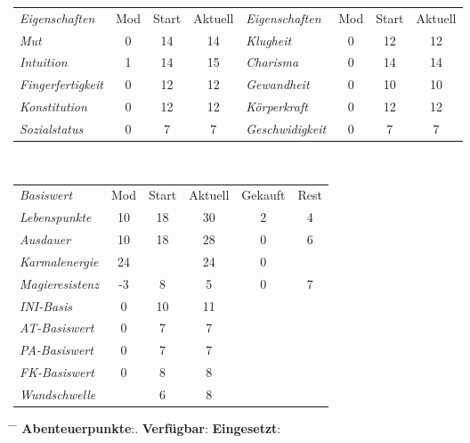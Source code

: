 \documentclass{article}
\begin{document}
  \begin{table}[!h]
    \begin{tabularx}{\textwidth}{|X|cc|c|X|cc|c|}
      \hline
      \rowcolor{gray}\emph{Eigenschaften}& Mod& Start & Aktuell & \emph{Eigenschaften}& Mod& Start & Aktuell\\
      \rowcolor{white}\emph{Mut}& 0& 14& 14&
      \emph{Klugheit}& 0& 12& 12\\
      \rowcolor{white}\emph{Intuition}& 1& 14& 15&
      \emph{Charisma}& 0& 14& 14\\
      \rowcolor{white}\emph{Fingerfertigkeit}& 0& 12& 12&
      \emph{Gewandheit}& 0& 10& 10\\
      \rowcolor{white}\emph{Konstitution}& 0& 12& 12&
      \emph{Körperkraft}& 0& 12& 12\\
      \rowcolor{white}\emph{Sozialstatus}& 0& 7& 7&
      \emph{Geschwidigkeit}& 0& 7& 7\\	
      \hline
    \end{tabularx}\\
    \begin{tabularx}{0.65\textwidth}{|X|cc|c|cc|}
      \hline
      \rowcolor{gray}\emph{Basiswert}& Mod& Start& Aktuell& Gekauft& Rest\\
      \rowcolor{white}\emph{Lebenspunkte}& 10& 18& 30& 2& 4\\
      \rowcolor{white}\emph{Ausdauer}& 10& 18& 28& 0& 6\\
      \rowcolor{white}\emph{Karmalenergie}& 24& & 24& 0& \\
      \rowcolor{white}\emph{Magieresistenz}&-3&  8&  5& 0& 7\\
      \rowcolor{white}\emph{INI-Basis}& 0& 10& 11&  &  \\ 
      \rowcolor{white}\emph{AT-Basiswert}& 0&  7&  7&  &  \\
      \rowcolor{white}\emph{PA-Basiswert}& 0&  7&  7&  &  \\
      \rowcolor{white}\emph{FK-Basiswert}& 0&  8&  8&  &  \\
      \rowcolor{white}\emph{Wundschwelle}&  &  6&  8&  &  \\
      \hline
    \end{tabularx}
  \end{table}

  \begin{mycolorbox}
    \begin{tabbing}
      \hspace{0.33\textwidth} \= \hspace{0.33\textwidth} \= \kill
      \textbf{Abenteuerpunkte}:.\>
      \textbf{Verfügbar}: \>
      \textbf{Eingesetzt}: \quad
    \end{tabbing}
  \end{mycolorbox}
  \clearpage
\end{document}
